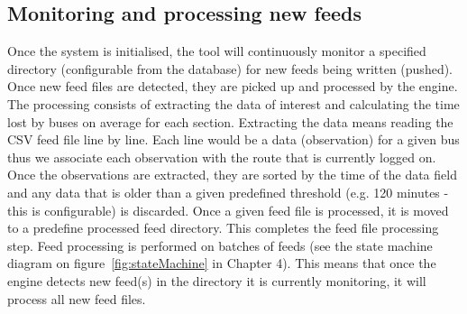 \subsection{Monitoring and processing new feeds}
Once the system is initialised, the tool will continuously monitor a specified directory (configurable from the database) for new feeds being written (pushed). Once new feed files are detected, they are picked up and processed by the engine. The processing consists of extracting the data of interest and calculating the time lost by buses on average for each section. Extracting the data means reading the CSV feed file line by line. Each line would be a data (observation) for a given bus thus we associate each observation with the route that is currently logged on. Once the observations are extracted, they are sorted by the time of the data field and any data that is older than a given predefined threshold (e.g. 120 minutes - this is configurable) is discarded. Once a given feed file is processed, it is moved to a predefine processed feed directory. This completes the feed file processing step. Feed processing is performed on batches of feeds (see the state machine diagram on figure~\ref{fig:stateMachine} in Chapter 4). This means that once the engine detects new feed(s) in the directory it is currently monitoring, it will process all new feed files. 

